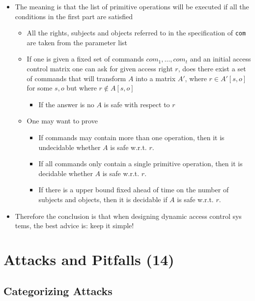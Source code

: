 \documentclass[11pt]{article}
\begin{document}
\begin{itemize}
\item The meaning is that the list of primitive operations will be executed if all the conditions in the first part are satisfied
\begin{itemize}
\item All the rights, subjects and objects referred to in the specification of \texttt{com} are taken from the parameter list
\item If one is given a fixed set of commands \(com_1, \dots, com_t\) and an initial access control matrix one can ask for given access right \(r\), does there exist a set of commands that will transform \(A\) into a matrix \(A'\), where \(r \in A'[s, o]\) for some \(s,o\) but where \(r \notin A[s, o]\)
\begin{itemize}
\item If the answer is no \(A\) is safe with respect to \(r\)
\end{itemize}
\item One may want to prove
\begin{itemize}
\item If commands may contain more than one operation, then it is undecidable whether \(A\) is safe w.r.t. \(r\).
\item If all commands only contain a single primitive operation, then it is decidable whether \(A\) is safe w.r.t. \(r\).
\item If there is a upper bound fixed ahead of time on the number of subjects and objects, then it is decidable if \(A\) is safe w.r.t. \(r\).
\end{itemize}
\end{itemize}

\item Therefore the conclusion is that when designing dynamic access control sys tems, the best advice is: keep it simple!
\end{itemize}

\section{Attacks and Pitfalls (14)}
\label{sec:org0d89e3e}
\subsection{Categorizing Attacks}
\label{sec:org2081f04}
\end{document}
